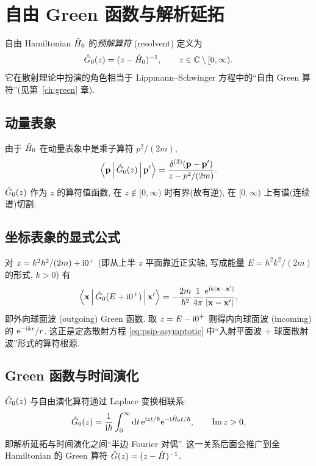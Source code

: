\section{自由 Green 函数与解析延拓}\label{sec:qm-free-green}

自由 Hamiltonian $\hat{H}_0$ 的\emph{预解算符} (resolvent) 定义为
\begin{equation}\label{eq:qm-G0-def}
\hat{G}_{0}(z)=(z-\hat{H}_{0})^{-1},\qquad z\in\mathbb{C}\setminus[0,\infty).
\end{equation}
它在散射理论中扮演的角色相当于 Lippmann--Schwinger 方程中的``自由 Green 算符''(见第~\ref{ch:green} 章).

\subsection{动量表象}

由于 $\hat{H}_0$ 在动量表象中是乘子算符 $p^{2}/(2m)$,
\begin{equation}\label{eq:qm-G0-p}
\left\langle \mathbf p \,\middle|\, \hat{G}_{0}(z) \,\middle|\, \mathbf p' \right\rangle=\frac{\delta^{(3)}(\mathbf p-\mathbf p')}{z-p^{2}/(2m)}.
\end{equation}
$\hat{G}_{0}(z)$ 作为 $z$ 的算符值函数, 在 $z\notin[0,\infty)$ 时有界(故有逆), 在 $[0,\infty)$ 上有谱(连续谱)切割.

\subsection{坐标表象的显式公式}

对 $z=k^{2}\hbar^{2}/(2m)+\mathrm{i} 0^{+}$ (即从上半 $z$ 平面靠近正实轴, 写成能量 $E=\hbar^{2}k^{2}/(2m)$ 的形式, $k>0$) 有
\begin{equation}\label{eq:qm-G0-x}
\left\langle \mathbf x \,\middle|\, \hat{G}_{0}(E+\mathrm{i} 0^{+}) \,\middle|\, \mathbf x' \right\rangle=-\frac{2m}{\hbar^{2}}\frac{1}{4\pi}\frac{\mathrm{e}^{\mathrm{i} k|\mathbf x-\mathbf x'|}}{|\mathbf x-\mathbf x'|},
\end{equation}
即外向球面波 (outgoing) Green 函数. 取 $z=E-\mathrm{i} 0^{+}$ 则得内向球面波 (incoming) 的 $\mathrm{e}^{-\mathrm{i} k r}/r$. 这正是定态散射方程 \eqref{eq:psip-asymptotic} 中``入射平面波 $+$ 球面散射波''形式的算符根源.

\subsection{Green 函数与时间演化}

$\hat{G}_{0}(z)$ 与自由演化算符通过 Laplace 变换相联系:
\begin{equation}\label{eq:qm-laplace}
\hat{G}_{0}(z)=\frac{1}{\mathrm{i}\hbar}\int_{0}^{\infty}\mathrm{d} t\,\mathrm{e}^{\mathrm{i} z t/\hbar}\mathrm{e}^{-\mathrm{i}\hat{H}_{0}t/\hbar},\qquad \mathrm{Im}\,z>0,
\end{equation}
即解析延拓与时间演化之间``半边 Fourier 对偶''. 这一关系后面会推广到全 Hamiltonian 的 Green 算符 $\hat{G}(z)=(z-\hat{H})^{-1}$.

